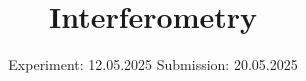 

\subject{V64}
\title{Interferometry}
\date{%
  Experiment: 12.05.2025
  \hspace{3em}
  Submission: 20.05.2025
}



\maketitle
\thispagestyle{empty}
\tableofcontents
\newpage






\printbibliography{}
\appendix
\setcounter{secnumdepth}{0}

